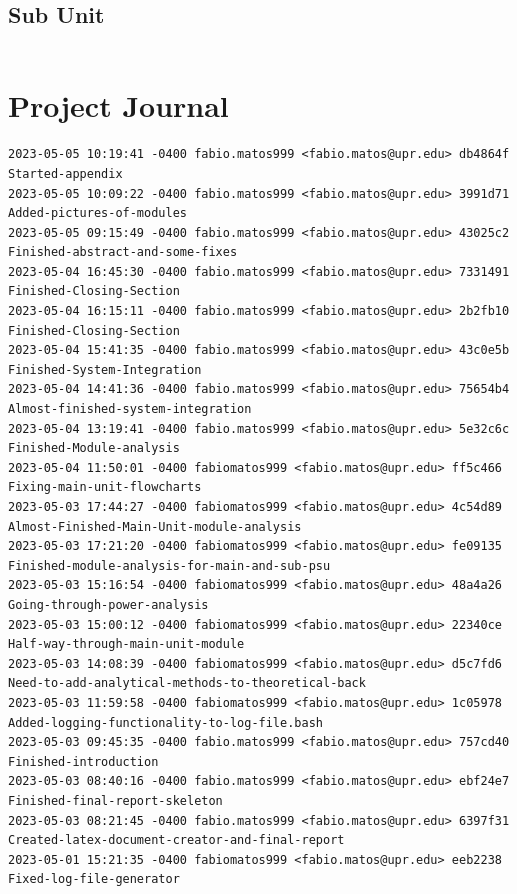 \documentclass[12pt]{article}
\newenvironment{code}{\captionsetup{type=listing}}{}
\begin{document}
\subsection{Sub Unit}
\begin{code}
  \label{code:sub-unit-main.c}
    \inputminted[breaklines,breakanywhere]{C}{../../Sub-Unit/main.c}

\end{code}
\section{Project Journal}
\begin{lstlisting}
2023-05-05 10:19:41 -0400 fabio.matos999 <fabio.matos@upr.edu> db4864f Started-appendix
2023-05-05 10:09:22 -0400 fabio.matos999 <fabio.matos@upr.edu> 3991d71 Added-pictures-of-modules
2023-05-05 09:15:49 -0400 fabio.matos999 <fabio.matos@upr.edu> 43025c2 Finished-abstract-and-some-fixes
2023-05-04 16:45:30 -0400 fabio.matos999 <fabio.matos@upr.edu> 7331491 Finished-Closing-Section
2023-05-04 16:15:11 -0400 fabio.matos999 <fabio.matos@upr.edu> 2b2fb10 Finished-Closing-Section
2023-05-04 15:41:35 -0400 fabio.matos999 <fabio.matos@upr.edu> 43c0e5b Finished-System-Integration
2023-05-04 14:41:36 -0400 fabio.matos999 <fabio.matos@upr.edu> 75654b4 Almost-finished-system-integration
2023-05-04 13:19:41 -0400 fabio.matos999 <fabio.matos@upr.edu> 5e32c6c Finished-Module-analysis
2023-05-04 11:50:01 -0400 fabiomatos999 <fabio.matos@upr.edu> ff5c466 Fixing-main-unit-flowcharts
2023-05-03 17:44:27 -0400 fabiomatos999 <fabio.matos@upr.edu> 4c54d89 Almost-Finished-Main-Unit-module-analysis
2023-05-03 17:21:20 -0400 fabiomatos999 <fabio.matos@upr.edu> fe09135 Finished-module-analysis-for-main-and-sub-psu
2023-05-03 15:16:54 -0400 fabiomatos999 <fabio.matos@upr.edu> 48a4a26 Going-through-power-analysis
2023-05-03 15:00:12 -0400 fabiomatos999 <fabio.matos@upr.edu> 22340ce Half-way-through-main-unit-module
2023-05-03 14:08:39 -0400 fabiomatos999 <fabio.matos@upr.edu> d5c7fd6 Need-to-add-analytical-methods-to-theoretical-back
2023-05-03 11:59:58 -0400 fabiomatos999 <fabio.matos@upr.edu> 1c05978 Added-logging-functionality-to-log-file.bash
2023-05-03 09:45:35 -0400 fabio.matos999 <fabio.matos@upr.edu> 757cd40 Finished-introduction
2023-05-03 08:40:16 -0400 fabio.matos999 <fabio.matos@upr.edu> ebf24e7 Finished-final-report-skeleton
2023-05-03 08:21:45 -0400 fabio.matos999 <fabio.matos@upr.edu> 6397f31 Created-latex-document-creator-and-final-report
2023-05-01 15:21:35 -0400 fabiomatos999 <fabio.matos@upr.edu> eeb2238 Fixed-log-file-generator

\end{lstlisting}
\end{document}
